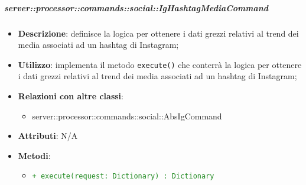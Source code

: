         \subparagraph{server::processor::commands::social::IgHashtagMediaCommand} %
        \label{subp:bdsm_app_server_processor_commands_social_twhashtagmediacommand}
        \begin{itemize}
          \item \textbf{Descrizione}: definisce la logica per ottenere i dati grezzi relativi al trend dei media associati ad un hashtag di Instagram;
          \item \textbf{Utilizzo}: implementa il metodo \texttt{execute()} che conterrà la logica per ottenere i dati grezzi relativi al trend dei media associati ad un hashtag di Instagram;
          \item \textbf{Relazioni con altre classi}:
            \begin{itemize}
              \item server::processor::commands::social::AbsIgCommand
            \end{itemize}
					\item \textbf{Attributi}: N/A
				\item \textbf{Metodi}:
        	\begin{itemize}
          		\item \textcolor{forestgreen}{\texttt{+ execute(request: Dictionary) : Dictionary}}
        	\end{itemize}
        \end{itemize}

